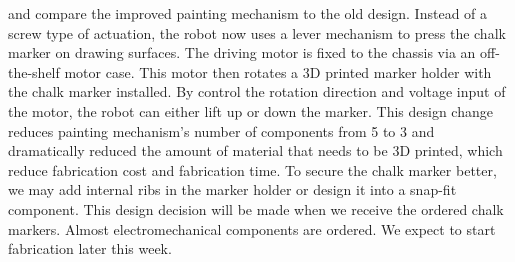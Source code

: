  and  compare the improved painting mechanism to the old design. Instead of a screw type of actuation, the robot now uses a lever mechanism to press the chalk marker on drawing surfaces. The driving motor is fixed to the chassis via an off-the-shelf motor case. This motor then rotates a 3D printed marker holder with the chalk marker installed. By control the rotation direction and voltage input of the motor, the robot can either lift up or down the marker. This design change reduces painting mechanism’s number of components from 5 to 3 and dramatically reduced the amount of material that needs to be 3D printed, which reduce fabrication cost and fabrication time. To secure the chalk marker better, we may add internal ribs in the marker holder or design it into a snap-fit component. This design decision will be made when we receive the ordered chalk markers. Almost electromechanical components are ordered. We expect to start fabrication later this week.

